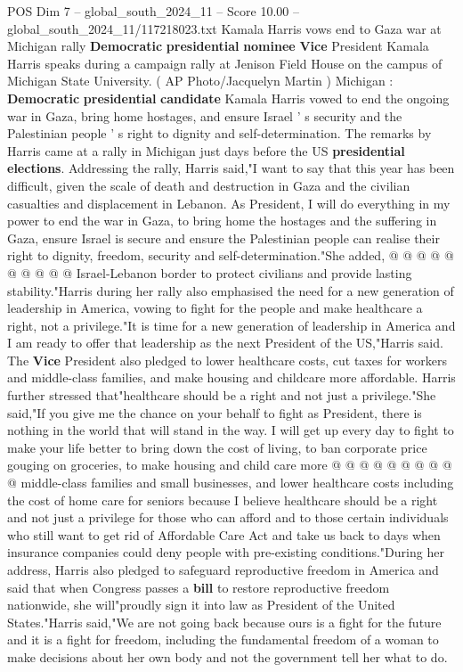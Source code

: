 \begin{textsample}{POS Dim 7 – global\_south\_2024\_11 – Score 10.00 – global\_south\_2024\_11/117218023.txt}  \label{ex:f7_pos_142}
Kamala Harris vows end to Gaza war at Michigan rally \textbf{Democratic} \textbf{presidential} \textbf{nominee} \textbf{Vice} President Kamala Harris speaks during a campaign rally at Jenison Field House on the campus of Michigan State University. ( AP Photo/Jacquelyn Martin ) Michigan : \textbf{Democratic} \textbf{presidential} \textbf{candidate} Kamala Harris vowed to end the ongoing war in Gaza, bring home hostages, and ensure Israel ' s security and the Palestinian people ' s right to dignity and self-determination.
The remarks by Harris came at a rally in Michigan just days before the US \textbf{presidential} \textbf{elections}.
Addressing the rally, Harris said,"I want to say that this year has been difficult, given the scale of death and destruction in Gaza and the civilian casualties and displacement in Lebanon.
As President, I will do everything in my power to end the war in Gaza, to bring home the hostages and the suffering in Gaza, ensure Israel is secure and ensure the Palestinian people can realise their right to dignity, freedom, security and self-determination."She added, @ @ @ @ @ @ @ @ @ @ Israel-Lebanon border to protect civilians and provide lasting stability."Harris during her rally also emphasised the need for a new generation of leadership in America, vowing to fight for the people and make healthcare a right, not a privilege."It is time for a new generation of leadership in America and I am ready to offer that leadership as the next President of the US,"Harris said.
The \textbf{Vice} President also pledged to lower healthcare costs, cut taxes for workers and middle-class families, and make housing and childcare more affordable.
Harris further stressed that"healthcare should be a right and not just a privilege."She said,"If you give me the chance on your behalf to fight as President, there is nothing in the world that will stand in the way.
I will get up every day to fight to make your life better to bring down the cost of living, to ban corporate price gouging on groceries, to make housing and child care more @ @ @ @ @ @ @ @ @ @ middle-class families and small businesses, and lower healthcare costs including the cost of home care for seniors because I believe healthcare should be a right and not just a privilege for those who can afford and to those certain individuals who still want to get rid of Affordable Care Act and take us back to days when insurance companies could deny people with pre-existing conditions."During her address, Harris also pledged to safeguard reproductive freedom in America and said that when Congress passes a \textbf{bill} to restore reproductive freedom nationwide, she will"proudly sign it into law as President of the United States."Harris said,"We are not going back because ours is a fight for the future and it is a fight for freedom, including the fundamental freedom of a woman to make decisions about her own body and not the government tell her what to do.

\end{textsample}
